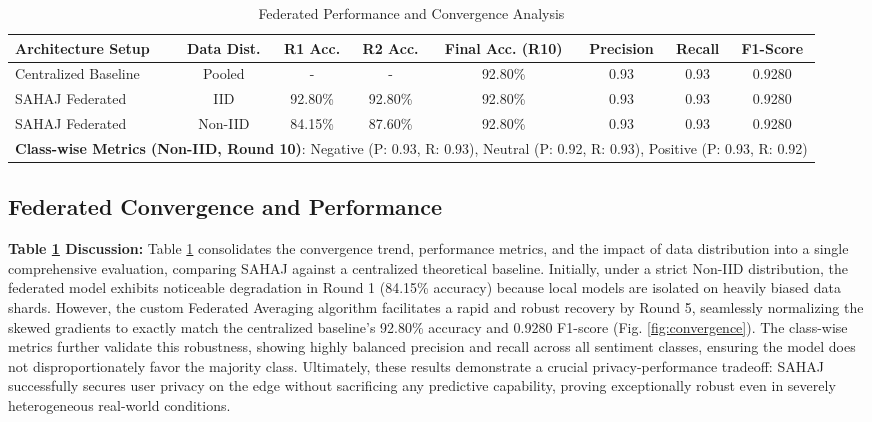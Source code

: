 \documentclass[conference]{IEEEtran}
\begin{document}
\begin{table}[t]
\caption{Federated Performance and Convergence Analysis}
\label{tab:performance}
\begin{center}
\begin{tabularx}{\textwidth}{l c c c c c c c}
\toprule
\textbf{Architecture Setup} & \textbf{Data Dist.} & \textbf{R1 Acc.} & \textbf{R2 Acc.} & \textbf{Final Acc. (R10)} & \textbf{Precision} & \textbf{Recall} & \textbf{F1-Score} \\
\midrule
Centralized Baseline & Pooled & - & - & 92.80\% & 0.93 & 0.93 & 0.9280 \\
SAHAJ Federated & IID & 92.80\% & 92.80\% & 92.80\% & 0.93 & 0.93 & 0.9280 \\
SAHAJ Federated & Non-IID & 84.15\% & 87.60\% & 92.80\% & 0.93 & 0.93 & 0.9280 \\
\midrule
\multicolumn{8}{l}{\textbf{Class-wise Metrics (Non-IID, Round 10)}: Negative (P: 0.93, R: 0.93), Neutral (P: 0.92, R: 0.93), Positive (P: 0.93, R: 0.92)} \\
\bottomrule
\end{tabularx}
\end{center}
\end{table}

\subsection{Federated Convergence and Performance}

\textbf{Table \ref{tab:performance} Discussion:} Table \ref{tab:performance} consolidates the convergence trend, performance metrics, and the impact of data distribution into a single comprehensive evaluation, comparing SAHAJ against a centralized theoretical baseline. Initially, under a strict Non-IID distribution, the federated model exhibits noticeable degradation in Round 1 (84.15\% accuracy) because local models are isolated on heavily biased data shards. However, the custom Federated Averaging algorithm facilitates a rapid and robust recovery by Round 5, seamlessly normalizing the skewed gradients to exactly match the centralized baseline's 92.80\% accuracy and 0.9280 F1-score (Fig. \ref{fig:convergence}). The class-wise metrics further validate this robustness, showing highly balanced precision and recall across all sentiment classes, ensuring the model does not disproportionately favor the majority class. Ultimately, these results demonstrate a crucial privacy-performance tradeoff: SAHAJ successfully secures user privacy on the edge without sacrificing any predictive capability, proving exceptionally robust even in severely heterogeneous real-world conditions.
\end{document}
